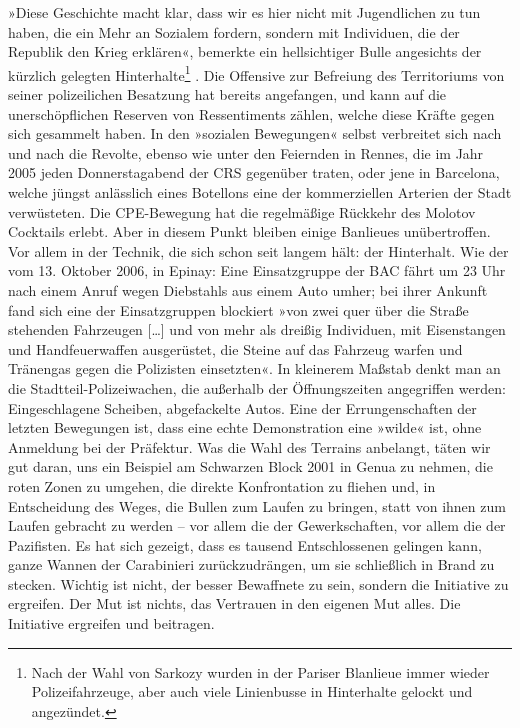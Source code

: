 »Diese Geschichte macht klar, dass wir es hier nicht mit
Jugendlichen zu tun haben, die ein Mehr an Sozialem fordern,
sondern mit Individuen, die der Republik den Krieg erklären«,
bemerkte ein hellsichtiger Bulle angesichts der kürzlich gelegten
Hinterhalte\footnote{
Nach der Wahl von Sarkozy wurden in der Pariser Blanlieue immer
wieder Polizeifahrzeuge, aber auch viele Linienbusse in Hinterhalte
gelockt und angezündet.
}%
. Die Offensive zur Befreiung des Territoriums von
seiner polizeilichen Besatzung hat bereits angefangen, und kann auf
die unerschöpflichen Reserven von Ressentiments zählen, welche
diese Kräfte gegen sich gesammelt haben. In den »sozialen
Bewegungen« selbst verbreitet sich nach und nach die Revolte,
ebenso wie unter den Feiernden in Rennes, die im Jahr 2005 jeden
Donnerstagabend der CRS gegenüber traten, oder jene in Barcelona,
welche jüngst anlässlich eines Botellons eine der kommerziellen
Arterien der Stadt verwüsteten. Die CPE-Bewegung hat die
regelmäßige Rückkehr des Molotov Cocktails erlebt. Aber in diesem
Punkt bleiben einige Banlieues unübertroffen. Vor allem in der
Technik, die sich schon seit langem hält: der Hinterhalt. Wie der
vom 13. Oktober 2006, in Epinay: Eine Einsatzgruppe der BAC fährt
um 23 Uhr nach einem Anruf wegen Diebstahls aus einem Auto umher;
bei ihrer Ankunft fand sich eine der Einsatzgruppen blockiert »von
zwei quer über die Straße stehenden Fahrzeugen [\ldots{}] und von mehr
als dreißig Individuen, mit Eisenstangen und Handfeuerwaffen
ausgerüstet, die Steine auf das Fahrzeug warfen und Tränengas gegen
die Polizisten einsetzten«. In kleinerem Maßstab denkt man an die
Stadtteil-Polizeiwachen, die außerhalb der Öffnungszeiten
angegriffen werden: Eingeschlagene Scheiben, abgefackelte Autos.
Eine der Errungenschaften der letzten Bewegungen ist, dass eine
echte Demonstration eine »wilde« ist, ohne Anmeldung bei der
Präfektur. Was die Wahl des Terrains anbelangt, täten wir gut
daran, uns ein Beispiel am Schwarzen Block 2001 in Genua zu nehmen,
die roten Zonen zu umgehen, die direkte Konfrontation zu fliehen
und, in Entscheidung des Weges, die Bullen zum Laufen zu bringen,
statt von ihnen zum Laufen gebracht zu werden – vor allem die der
Gewerkschaften, vor allem die der Pazifisten. Es hat sich gezeigt,
dass es tausend Entschlossenen gelingen kann, ganze Wannen der
Carabinieri zurückzudrängen, um sie schließlich in Brand zu
stecken. Wichtig ist nicht, der besser Bewaffnete zu sein, sondern
die Initiative zu ergreifen. Der Mut ist nichts, das Vertrauen in
den eigenen Mut alles. Die Initiative ergreifen und beitragen.

